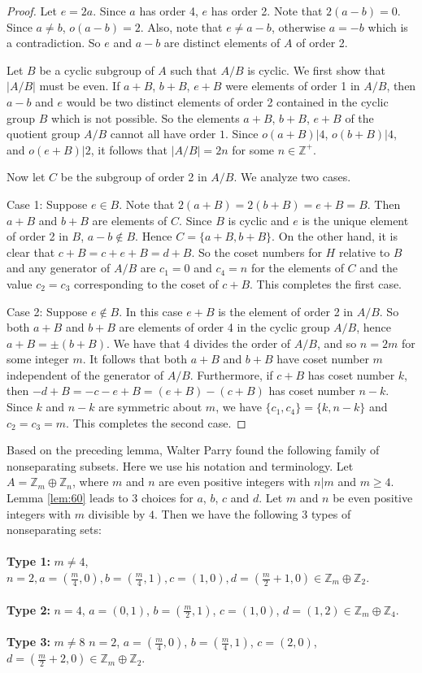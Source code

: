 \documentclass[article,dvisp]{amsart}
\def\Z{\mathbb{Z}}
\theoremstyle{definition}
\theoremstyle{remark}
\numberwithin{equation}{section}
\theoremstyle{lemma}
\begin{document}
\begin{proof} Let $e=2a$. Since $a$ has order 4, $e$ has order 2. Note that $2(a-b)=0$. Since $a\ne b$, $o(a-b)=2$. Also, note that $e\neq a-b$, otherwise $a=-b$ which is a contradiction. So $e$ and $a-b$ are distinct elements of $A$ of order 2.

Let $B$ be a cyclic subgroup of $A$ such that $A/B$ is cyclic. We first show that $|A/B|$ must be even. If $a+B$, $b+B$, $e+B$ were elements of order 1 in $A/B$, then $a-b$ and $e$ would be two distinct elements of order 2 contained in the cyclic group $B$ which is not possible. So the elements $a+B$, $b+B$, $e+B$ of the quotient group $A/B$ cannot all have order $1$. Since $o(a+B)|4$, $o(b + B)|4$, and $o(e+B)|2$, it follows that $|A/B|=2n$ for some $n\in\Z^{+}$.

Now let $C$ be the subgroup of order 2 in $A/B$. We analyze two cases.

Case 1: Suppose $e \in B$. Note that $2(a+B)=2(b+B)=e+B=B$. Then $a+B$ and $b+B$ are elements of $C$. Since $B$ is cyclic and $e$ is the unique element of order 2 in $B$, $a-b\notin B$. Hence $C=\{a+B,b+B\}$. On the other hand, it is clear that $c+B=c+e+B=d+B$. So the coset numbers for $H$ relative to $B$ and any generator of $A/B$ are $c_1=0$ and $c_4=n$ for the elements of $C$ and the value $c_{2}=c_{3}$ corresponding to the coset of $c+B$. This completes the first case.

Case 2: Suppose $e\notin B$. In this case $e+B$ is the element of order 2 in $A/B$. So both $a+B$ and $b+B$ are elements of order 4 in the cyclic group $A/B$, hence $a+B=\pm(b+B)$. We have that 4 divides the order of $A/B$, and so $n=2m$ for some integer $m$. It follows that both $a+B$ and $b+B$ have coset number $m$ independent of the generator of $A/B$. Furthermore, if $c+B$ has coset number $k$, then $-d+B=-c-e+B=(e+B)-(c+B)$ has coset number $n-k$. Since $k$ and $n-k$ are symmetric about $m$, we have $\{c_1,c_4\}=\{k,n - k\}$ and $c_2=c_3=m$. This completes the second case.\end{proof}

Based on the preceding lemma, Walter Parry found the following family of nonseparating subsets. Here we use his notation and terminology. Let $A=\Z_{m}\oplus \Z_{n}$, where $m$ and $n$ are even positive integers with $n|m$ and $m\geq4$. Lemma \ref{lem:60} leads to 3 choices for $a$, $b$, $c$ and $d$. Let $m$ and $n$ be even positive integers with $m$ divisible by $4$. Then we have the following 3 types of nonseparating sets:\\
\\
\textbf{Type 1:} $m \ne 4$, $n = 2, a = (\frac{m}{4}, 0), b = (\frac{m}{4}, 1), c = (1, 0), d = (\frac{m}{2} + 1, 0) \in \Z_{m}\oplus \Z_{2}$.\\
\\
\textbf{Type 2:} $n = 4$, $a=(0,1)$, $b=(\frac{m}{2}, 1)$, $c=(1,0)$, $d=(1, 2)\in\Z_{m}\oplus \Z_{4}$.\\
\\
\textbf{Type 3:} $m\ne8$ $n=2$, $a=(\frac{m}{4}, 0)$, $b=(\frac{m}{4},1)$, $c=(2, 0)$, $d=(\frac{m}{2}+2, 0)\in\Z_{m}\oplus \Z_{2}$.\\
\end{document}
